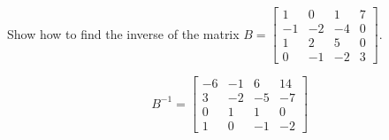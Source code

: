 
\begin{exerciseStatement}


Show how to find the inverse of the matrix \(B= \left[\begin{array}{cccc}
1 & 0 & 1 & 7 \\
-1 & -2 & -4 & 0 \\
1 & 2 & 5 & 0 \\
0 & -1 & -2 & 3
\end{array}\right] \).


\end{exerciseStatement}
    
\begin{exerciseAnswer} 
\[B^{-1}= \left[\begin{array}{cccc}
-6 & -1 & 6 & 14 \\
3 & -2 & -5 & -7 \\
0 & 1 & 1 & 0 \\
1 & 0 & -1 & -2
\end{array}\right] \]
\end{exerciseAnswer}
    

